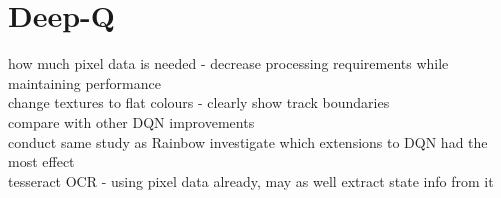 \section{Deep-Q}
how much pixel data is needed - decrease processing requirements while maintaining performance
\\ change textures to flat colours - clearly show track boundaries
\\ compare with other DQN improvements
\\ conduct same study as Rainbow \cite{hessel2018rainbow} investigate which extensions to DQN had the most effect
\\ tesseract OCR - using pixel data already, may as well extract state info from it